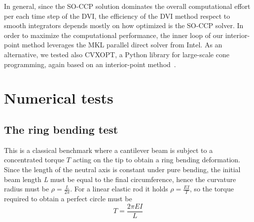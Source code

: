 \documentclass[review]{elsarticle}
\begin{document}
In general, since the SO-CCP solution dominates the overall computational effort per each time step of the DVI, the efficiency of the DVI method respect to smooth integrators depends mostly on how optimized is the SO-CCP solver. 
In order to maximize the computational performance, the inner loop of our interior-point method leverages the MKL parallel direct solver from Intel. As an alternative, we tested also CVXOPT, a Python library for large-scale cone programming, again based on an interior-point method~\cite{andersen2011interior}. 




\section{Numerical tests}

%
% 

\subsection{The ring bending test}

This is a classical benchmark where a cantilever beam is subject to a concentrated torque $T$ acting on the tip to obtain a ring bending deformation. Since the length of the neutral axis is constant under pure bending, the initial beam length \emph{L} must be equal to the final circumference, hence the curvature radius must be $\rho = \frac{L}{2\pi}$.
For a linear elastic rod it holds
$\rho = \frac{E I}{T}$, so the torque required to obtain a perfect circle must be 
%
\begin{equation}
T = \frac{2\pi EI}{L} \nonumber
\end{equation}
\end{document}
